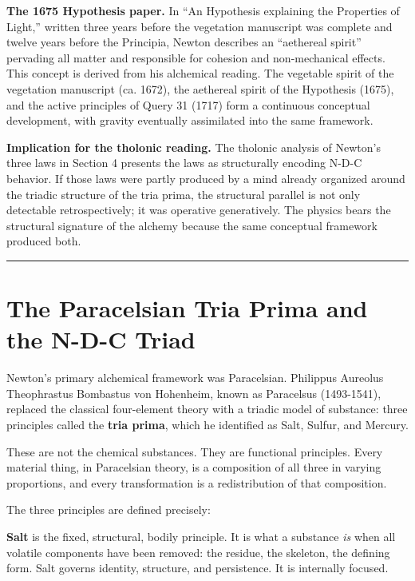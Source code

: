 \documentclass[12pt]{article}
\begin{document}
\textbf{The 1675 Hypothesis paper.} In ``An Hypothesis explaining the
Properties of Light,'' written three years before the vegetation
manuscript was complete and twelve years before the Principia, Newton
describes an ``aethereal spirit'' pervading all matter and responsible
for cohesion and non-mechanical effects. This concept is derived from
his alchemical reading. The vegetable spirit of the vegetation
manuscript (ca. 1672), the aethereal spirit of the Hypothesis (1675),
and the active principles of Query 31 (1717) form a continuous
conceptual development, with gravity eventually assimilated into the
same framework.

\textbf{Implication for the tholonic reading.} The tholonic analysis of
Newton's three laws in Section 4 presents the laws as structurally
encoding N-D-C behavior. If those laws were partly produced by a mind
already organized around the triadic structure of the tria prima, the
structural parallel is not only detectable retrospectively; it was
operative generatively. The physics bears the structural signature of
the alchemy because the same conceptual framework produced both.

\begin{center}\rule{0.5\linewidth}{0.5pt}\end{center}

\section{The Paracelsian Tria Prima and the N-D-C Triad}\label{the-paracelsian-tria-prima-and-the-n-d-c-triad}

Newton's primary alchemical framework was Paracelsian. Philippus
Aureolus Theophrastus Bombastus von Hohenheim, known as Paracelsus
(1493-1541), replaced the classical four-element theory with a triadic
model of substance: three principles called the \textbf{tria prima},
which he identified as Salt, Sulfur, and Mercury.

These are not the chemical substances. They are functional principles.
Every material thing, in Paracelsian theory, is a composition of all
three in varying proportions, and every transformation is a
redistribution of that composition.

The three principles are defined precisely:

\textbf{Salt} is the fixed, structural, bodily principle. It is what a
substance \emph{is} when all volatile components have been removed: the
residue, the skeleton, the defining form. Salt governs identity,
structure, and persistence. It is internally focused.
\end{document}
